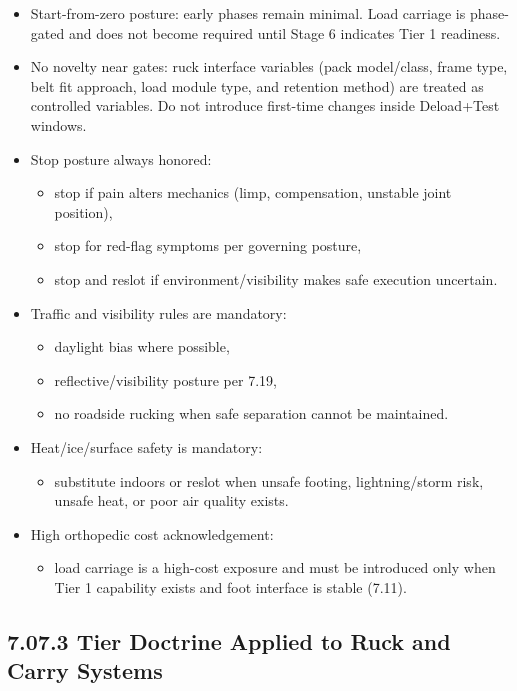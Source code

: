 \documentclass[10pt]{article}
\begin{document}
\begin{itemize}
\item Start-from-zero posture: early phases remain minimal. Load carriage is phase-gated and does not become required until Stage 6 indicates Tier 1 readiness.
\item No novelty near gates: ruck interface variables (pack model/class, frame type, belt fit approach, load module type, and retention method) are treated as controlled variables. Do not introduce first-time changes inside Deload+Test windows.
\item Stop posture always honored:
  \begin{itemize}
  \item stop if pain alters mechanics (limp, compensation, unstable joint position),
  \item stop for red-flag symptoms per governing posture,
  \item stop and reslot if environment/visibility makes safe execution uncertain.
  \end{itemize}
\item Traffic and visibility rules are mandatory:
  \begin{itemize}
  \item daylight bias where possible,
  \item reflective/visibility posture per 7.19,
  \item no roadside rucking when safe separation cannot be maintained.
  \end{itemize}
\item Heat/ice/surface safety is mandatory:
  \begin{itemize}
  \item substitute indoors or reslot when unsafe footing, lightning/storm risk, unsafe heat, or poor air quality exists.
  \end{itemize}
\item High orthopedic cost acknowledgement:
  \begin{itemize}
  \item load carriage is a high-cost exposure and must be introduced only when Tier 1 capability exists and foot interface is stable (7.11).
  \end{itemize}
\end{itemize}

\subsection*{7.07.3 Tier Doctrine Applied to Ruck and Carry Systems}
{}
\end{document}
